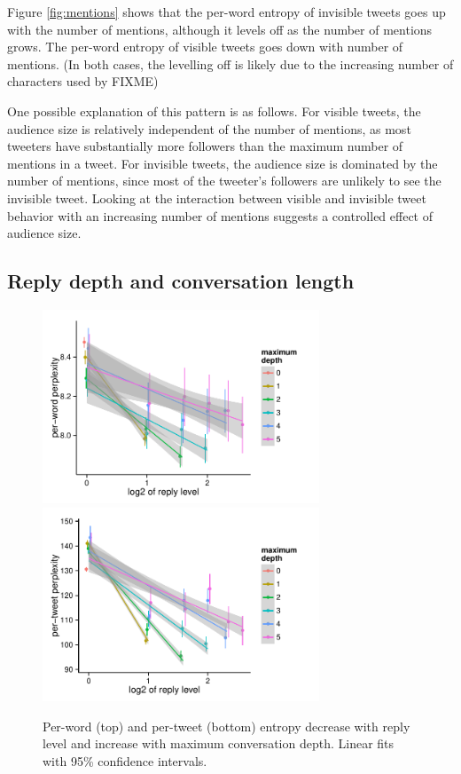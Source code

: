 \documentclass[11pt,letterpaper]{article}
\begin{document}
Figure \ref{fig:mentions} shows that the per-word entropy of invisible tweets goes up with the number of mentions, although it levels off as the number of mentions grows.  The per-word entropy of visible tweets goes down with number of mentions.  (In both cases, the levelling off is likely due to the increasing number of characters used by FIXME)

One possible explanation of this pattern is as follows. For visible tweets, the audience size is relatively independent of the number of mentions, as most tweeters have substantially more followers than the maximum number of mentions in a tweet.  For invisible tweets, the audience size is dominated by the number of mentions, since most of the tweeter's followers are unlikely to see the invisible tweet.  Looking at the interaction between visible and invisible tweet behavior with an increasing number of mentions suggests a controlled effect of audience size.

\subsection{Reply depth and conversation length}

\begin{figure}[t]
 \centering
  \includegraphics[width=3.25in]{figures/cmcl-rlevel-pw.pdf}
  \includegraphics[width=3.25in]{figures/cmcl-rlevel-pt.pdf}
 \caption{Per-word (top) and per-tweet (bottom) entropy decrease with reply level and increase with maximum conversation depth. Linear fits with 95\% confidence intervals.}\label{fig:rlevel-maxdesc}\vspace*{-.5em}
\end{figure}
\end{document}
